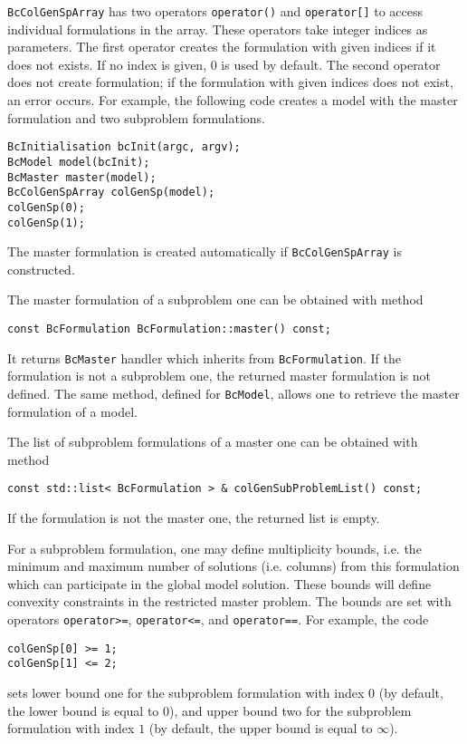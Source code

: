 \documentclass[10pt,a4paper]{article}
\begin{document}
\verb+BcColGenSpArray+ has two operators \verb+operator()+ and \verb+operator[]+ to access individual formulations in
the array. These operators take integer indices as parameters. The first operator creates the formulation with given
indices if it does not exists. If no index is given, $0$ is used by default. The second operator does not create
formulation; if the formulation with given indices does not exist, an error occurs. For example, the following code
creates a model with the master formulation and two subproblem formulations.
\begin{lstlisting}
BcInitialisation bcInit(argc, argv);
BcModel model(bcInit);
BcMaster master(model);
BcColGenSpArray colGenSp(model);
colGenSp(0);
colGenSp(1);
\end{lstlisting}
The master formulation is created automatically if \verb+BcColGenSpArray+ is constructed. 

The master formulation of a subproblem one can be obtained with method
\begin{lstlisting}
const BcFormulation BcFormulation::master() const;
\end{lstlisting}
It returns \verb+BcMaster+ handler which inherits from \verb+BcFormulation+. If the formulation is not a subproblem one,
the returned master formulation is not defined. The same method, defined for \verb+BcModel+, allows one to retrieve the
master formulation of a model.

The list of subproblem formulations of a master one can be obtained with method
\begin{lstlisting}
const std::list< BcFormulation > & colGenSubProblemList() const;
\end{lstlisting}
If the formulation is not the master one, the returned list is empty.

For a subproblem formulation, one may define multiplicity bounds, i.e. the minimum and maximum number of solutions
(i.e. columns) from this formulation which can participate in the global model solution. These bounds will define
convexity constraints in the restricted master problem. The bounds are set with operators \verb+operator>=+,
\verb+operator<=+, and \verb+operator==+. For example, the code
\begin{lstlisting}
colGenSp[0] >= 1;
colGenSp[1] <= 2;
\end{lstlisting}
sets lower bound one for the subproblem formulation with index $0$ (by default, the lower bound is equal to $0$), and
upper bound two for the subproblem formulation with index $1$ (by default, the upper bound is equal to $\infty$).
\end{document}
